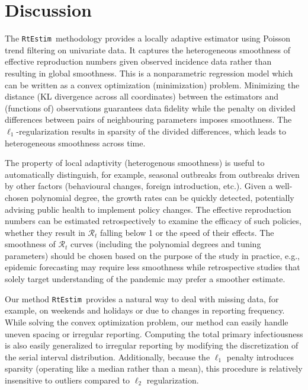\documentclass[10pt,letterpaper]{article}
\def\RtEstim{\texttt{RtEstim}}
\def\calR{\mathcal{R}}
\begin{document}
\section{Discussion}

The \RtEstim\ methodology provides a locally adaptive estimator using Poisson
trend filtering on univariate data. It captures the heterogeneous smoothness of
effective reproduction numbers given observed incidence data rather than
resulting in global smoothness. This is a nonparametric regression model which
can be written as a convex optimization (minimization) problem. Minimizing the
distance (KL divergence across all coordinates) between the estimators and
(functions of) observations guarantees data fidelity while the penalty on divided
differences between pairs of neighbouring parameters imposes smoothness. The
$\ell_1$-regularization results in sparsity of the divided differences, which
leads to heterogeneous smoothness across time. 


The property of local adaptivity (heterogenous smoothness) is useful to
automatically distinguish, for example, seasonal outbreaks from outbreaks driven
by other factors (behavioural changes, foreign introduction, etc.). Given a
well-chosen polynomial degree, the growth rates can be quickly detected, 
potentially advising public health to implement policy changes. The effective
reproduction numbers can be estimated retrospectively to examine the efficacy of
such policies, whether they result in $\calR_t$ falling below 1 or the speed of
their effects. The smoothness of $\calR_t$ curves (including the polynomial 
degrees and tuning parameters) should be chosen based on the purpose of the 
study in practice, e.g., epidemic forecasting may require less smoothness
while retrospective studies that 
solely target understanding of the pandemic may prefer a smoother estimate. 


Our method \RtEstim\ provides a natural way to deal with missing data, for
example, on weekends and holidays or due to changes in reporting frequency.
While solving the convex optimization problem, our method can easily 
handle uneven spacing or irregular reporting. Computing the total
primary infectiousness is also easily generalized to irregular reporting by
modifying the discretization of the serial interval distribution. Additionally,
because the $\ell_1$ penalty introduces sparsity (operating like a median
rather than a mean), this procedure is relatively insensitive to outliers
compared to $\ell_2$ regularization.
\end{document}
